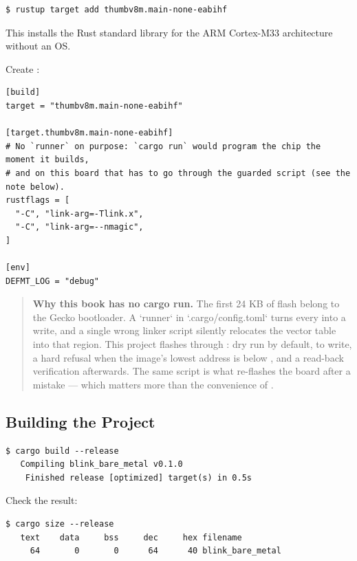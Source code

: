 \begin{verbatim}
$ rustup target add thumbv8m.main-none-eabihf
\end{verbatim}

This installs the Rust standard library for the ARM Cortex-M33 architecture without an OS.

Create :

\begin{verbatim}
[build]
target = "thumbv8m.main-none-eabihf"

[target.thumbv8m.main-none-eabihf]
# No `runner` on purpose: `cargo run` would program the chip the moment it builds,
# and on this board that has to go through the guarded script (see the note below).
rustflags = [
  "-C", "link-arg=-Tlink.x",
  "-C", "link-arg=--nmagic",
]

[env]
DEFMT_LOG = "debug"
\end{verbatim}

\begin{quote}
\textbf{Why this book has no cargo run.} The first 24 KB of flash
belong to the Gecko bootloader. A `runner` in `.cargo/config.toml` turns every
 into a write, and a single wrong linker script silently relocates
the vector table into that region. This project flashes through
: dry run by default,  to write,
a hard refusal when the image's lowest address is below , and a
read-back verification afterwards. The same script is what re-flashes the board after a
mistake — which matters more than the convenience of .
\end{quote}

\subsection{Building the Project}

\begin{verbatim}
$ cargo build --release
   Compiling blink_bare_metal v0.1.0
    Finished release [optimized] target(s) in 0.5s
\end{verbatim}

Check the result:

\begin{verbatim}
$ cargo size --release
   text    data     bss     dec     hex filename
     64       0       0      64      40 blink_bare_metal
\end{verbatim}

